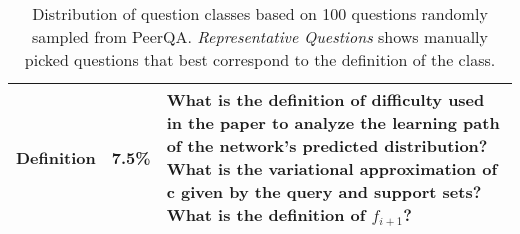 \begin{table*}[ht]
\begin{tabularx}{\textwidth}{@{}p{2.5cm}p{1cm}X@{}}
Definition & 7.5\% & What is the definition of difficulty used in the paper to analyze the learning path of the network's predicted distribution? What is the variational approximation of c given by the query and support sets? What is the definition of $f_{i+1}$? \\ 
\bottomrule
\end{tabularx}
\caption{Distribution of question classes based on 100 questions randomly sampled from PeerQA. \textit{Representative Questions} shows manually picked questions that best correspond to the definition of the class.}
\label{tbl:question-classes}
\end{table*}